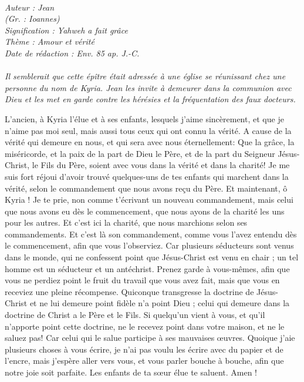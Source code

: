 \BFont
\noindent\hrulefill
{\footnotesize
\textit{
\bigskip
{\centering{}
\\Auteur : Jean
\\(Gr. : Ioannes)
\\Signification : Yahweh a fait grâce
\\Thème : Amour et vérité
\\Date de rédaction : Env. 85 ap. J.-C.\\}
}
\textit{
\\Il semblerait que cette épître était adressée à une église se réunissant chez une personne du nom de Kyria. Jean les invite à demeurer dans la communion avec Dieu et les met en garde contre les hérésies et la fréquentation des faux docteurs.\bigskip
}
}
\par\nobreak\noindent\hrulefill
\begin{multicols}{2}
\VerseOne{}L'ancien, à Kyria l'élue et à ses enfants, lesquels j'aime sincèrement, et que je n'aime pas moi seul, mais aussi tous ceux qui ont connu la vérité.
A cause de la vérité qui demeure en nous, et qui sera avec nous éternellement:
Que la grâce, la miséricorde, et la paix de la part de Dieu le Père, et de la part du Seigneur Jésus-Christ, le Fils du Père, soient avec vous dans la vérité et dans la charité!
Je me suis fort réjoui d'avoir trouvé quelques-uns de tes enfants qui marchent dans la vérité, selon le commandement que nous avons reçu du Père.
Et maintenant, ô Kyria ! Je te prie, non comme t'écrivant un nouveau commandement, mais celui que nous avons eu dès le commencement, que nous ayons de la charité les uns pour les autres.
Et c'est ici la charité, que nous marchions selon ses commandements. Et c'est là son commandement, comme vous l'avez entendu dès le commencement, afin que vous l'observiez.
Car plusieurs séducteurs sont venus dans le monde, qui ne confessent point que Jésus-Christ est venu en chair ; un tel homme est un séducteur et un antéchrist.
Prenez garde à vous-mêmes, afin que vous ne perdiez point le fruit du travail que vous avez fait, mais que vous en receviez une pleine récompense.
Quiconque transgresse la doctrine de Jésus-Christ et ne lui demeure point fidèle n'a point Dieu ; celui qui demeure dans la doctrine de Christ a le Père et le Fils.
Si quelqu'un vient à vous, et qu'il n'apporte point cette doctrine, ne le recevez point dans votre maison, et ne le saluez pas!
Car celui qui le salue participe à ses mauvaises œuvres.
Quoique j'aie plusieurs choses à vous écrire, je n'ai pas voulu les écrire avec du papier et de l'encre, mais j'espère aller vers vous, et vous parler bouche à bouche, afin que notre joie soit parfaite.
Les enfants de ta sœur élue te saluent. Amen !
\PPE{}
\end{multicols}
